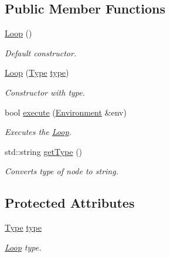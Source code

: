 \subsection*{Public Member Functions}
\begin{DoxyCompactItemize}
\item 
\hypertarget{classLoop_a675e74b960c5e703adf1ee0e6fd8f3bf}{}\hyperlink{classLoop_a675e74b960c5e703adf1ee0e6fd8f3bf}{Loop} ()\label{classLoop_a675e74b960c5e703adf1ee0e6fd8f3bf}

\begin{DoxyCompactList}\small\item\em Default constructor. \end{DoxyCompactList}\item 
\hyperlink{classLoop_a3e42ab398babe1ba79e9242d64147960}{Loop} (\hyperlink{classLoop_af57e9c094063c514758dfe7bd986d6e7}{Type} \hyperlink{classLoop_ae5e7c727c194b408bfc69b3f218c8b6f}{type})
\begin{DoxyCompactList}\small\item\em Constructor with type. \end{DoxyCompactList}\item 
bool \hyperlink{classLoop_a661edc5e6b0f90787e2a55922109f110}{execute} (\hyperlink{classEnvironment}{Environment} \&env)
\begin{DoxyCompactList}\small\item\em Executes the \hyperlink{classLoop}{Loop}. \end{DoxyCompactList}\item 
std\+::string \hyperlink{classLoop_a657b90074652fce7ab2028bdc3747b7b}{get\+Type} ()
\begin{DoxyCompactList}\small\item\em Converts type of node to string. \end{DoxyCompactList}\end{DoxyCompactItemize}
\subsection*{Protected Attributes}
\begin{DoxyCompactItemize}
\item 
\hypertarget{classLoop_ae5e7c727c194b408bfc69b3f218c8b6f}{}\hyperlink{classLoop_af57e9c094063c514758dfe7bd986d6e7}{Type} \hyperlink{classLoop_ae5e7c727c194b408bfc69b3f218c8b6f}{type}\label{classLoop_ae5e7c727c194b408bfc69b3f218c8b6f}

\begin{DoxyCompactList}\small\item\em \hyperlink{classLoop}{Loop} type. \end{DoxyCompactList}\end{DoxyCompactItemize}


